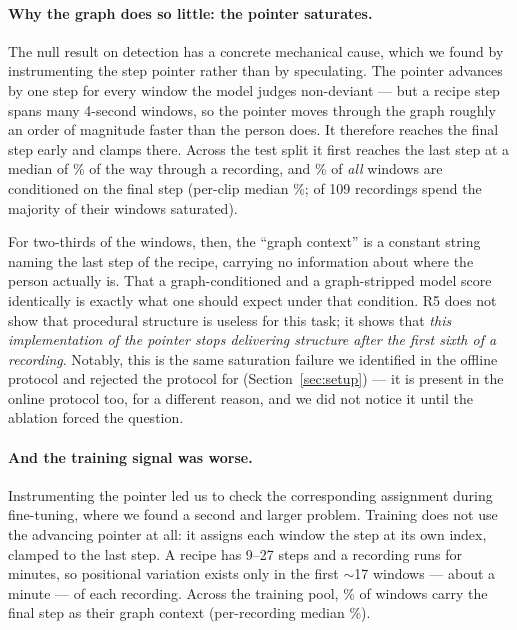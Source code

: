 \documentclass[10pt,twocolumn]{article}
\begin{document}
\paragraph{Why the graph does so little: the pointer saturates.}
The null result on detection has a concrete mechanical cause, which we found by
instrumenting the step pointer rather than by speculating. The pointer advances
by one step for every window the model judges non-deviant --- but a recipe step
spans many 4-second windows, so the pointer moves through the graph roughly an
order of magnitude faster than the person does. It therefore reaches the final
step early and clamps there. Across the test split it first reaches the last step
at a median of \satReach{}\% of the way through a recording, and \satPct{}\% of
\emph{all} windows are conditioned on the final step (per-clip median
\satMed{}\%; \satClips{} of 109 recordings spend the majority of their windows
saturated).

For two-thirds of the windows, then, the ``graph context'' is a constant string
naming the last step of the recipe, carrying no information about where the
person actually is. That a graph-conditioned and a graph-stripped model score
identically is exactly what one should expect under that condition. R5 does not
show that procedural structure is useless for this task; it shows that
\emph{this implementation of the pointer stops delivering structure after the
first sixth of a recording}. Notably, this is the same saturation failure we
identified in the offline protocol and rejected the protocol for
(Section~\ref{sec:setup}) --- it is present in the online protocol too, for a
different reason, and we did not notice it until the ablation forced the
question.

\paragraph{And the training signal was worse.} Instrumenting the pointer led us
to check the corresponding assignment during fine-tuning, where we found a
second and larger problem. Training does not use the advancing pointer at all:
it assigns each window the step at its own index, clamped to the last step. A
recipe has 9--27 steps and a recording runs for minutes, so positional variation
exists only in the first $\sim$17 windows --- about a minute --- of each
recording. Across the training pool, \satTrain{}\% of windows carry the final
step as their graph context (per-recording median \satTrainMed{}\%).
\end{document}
